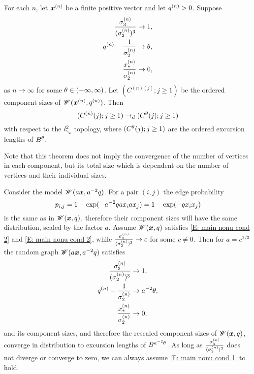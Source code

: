 \begin{theorem} \label{T: Main nonuniform}
	For each $n$, let $\boldsymbol{x}^{(n)}$ be a finite positive vector and let $q^{(n)} > 0$.
	Suppose
	\begin{align}
		\frac{\sigma^{(n)}_3}{(\sigma^{(n)}_2)^3} &\rightarrow 1, \label{E: main nonu cond 1} \\ 
		q^{(n)} - \frac{1}{\sigma^{(n)}_2} &\rightarrow \theta, \label{E: main nonu cond 2} \\ 
		\frac{x_*^{(n)}}{\sigma^{(n)}_2} &\rightarrow 0, \label{E: main nonu cond 3}
	\end{align}
	as $n \rightarrow \infty$ for some $\theta \in (-\infty, \infty)$.
	Let $(C^{(n)(j)}; j \geq 1)$ be the ordered component sizes of $\mathscr{W}(\boldsymbol{x}^{(n)}, q^{(n)})$.
	Then
	\begin{equation}
		(C^{(n)}(j); j \geq 1) \rightarrow_d (C^{\theta}(j); j \geq 1)
	\end{equation}
	with respect to the $\mathit{l}^2_{\searrow}$ topology, where $(C^{\theta}(j); j \geq 1)$ are the ordered excursion lengths of $B^{\theta}$.
\end{theorem}

Note that this theorem does not imply the convergence of the number of vertices in each component,
but its total size which is dependent on the number of vertices and their individual sizes.

Consider the model $\mathscr{W}(a\boldsymbol{x}, a^{-2}q)$.
For a pair $(i,j)$ the edge probability
\begin{equation}
	p_{i,j} = 1 - \exp(-a^{-2}q ax_iax_j) = 1 - \exp(-q x_ix_j)
\end{equation}
is the same as in $\mathscr{W}(\boldsymbol{x}, q)$,
therefore their component sizes will have the same distribution,
scaled by the factor $a$.
Assume $\mathscr{W}(\boldsymbol{x}, q)$ satisfies \eqref{E: main nonu cond 2} and \eqref{E: main nonu cond 2},
while $\frac{\sigma^{(n)}_3}{(\sigma^{(n)}_2)^3} \rightarrow c$ for some $c \neq 0$.
Then for $a = c^{1/3}$ the random graph $\mathscr{W}(a\boldsymbol{x}, a^{-2}q)$ satisfies
\begin{equation}
	\begin{aligned}
	\frac{\sigma^{(n)}_3}{(\sigma^{(n)}_2)^3} &\rightarrow 1, \\ 
	q^{(n)} - \frac{1}{\sigma^{(n)}_2} &\rightarrow a^{-2}\theta, \\
	\frac{x_*^{(n)}}{\sigma^{(n)}_2} &\rightarrow 0,
	\end{aligned}
\end{equation}
and its component sizes,
and therefore the rescaled component sizes of $\mathscr{W}(\boldsymbol{x}, q)$,
converge in distribution to excursion lengths of $B^{a^{-2}\theta}$.
As long as $\frac{\sigma^{(n)}_3}{(\sigma^{(n)}_2)^3}$ does not diverge or converge to zero,
we can always assume \eqref{E: main nonu cond 1} to hold.

